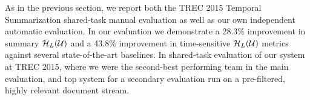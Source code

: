 As in the previous section,  we report both the TREC 2015 Temporal
Summarization shared-task manual evaluation as well as our own independent
automatic evaluation.  In our evaluation we demonstrate a 28.3\% improvement
in summary $\mathcal{H}_L(\mathcal{U})$ and a 43.8\% improvement in
time-sensitive $\mathcal{H}_L(\mathcal{U})$ metrics against several
state-of-the-art baselines.  In shared-task evaluation of our system at TREC
2015, where we were the second-best performing team in the main evaluation,
and top system for a secondary evaluation run on a pre-filtered, highly
relevant  document stream.



 
% 
